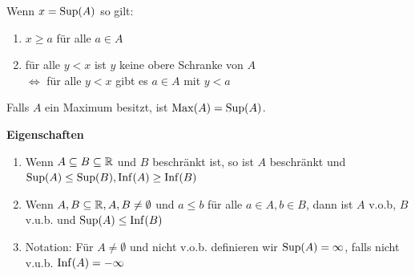 Wenn \textbf{$x = \mathrm{Sup}(A)$} so gilt: 
\begin{enumerate}[label = (\arabic*)]
	\item{\(x\geq a\) für alle \(a\in A\)}
	\item{für alle \(y<x\) ist \(y\) keine obere Schranke von \(A\)\\
			   \(\Leftrightarrow\) für alle \(y<x\) gibt es \(a\in A\) mit \(y<a\)}
\end{enumerate}

Falls $A$ ein Maximum besitzt, ist $\mathrm{Max}(A) = \mathrm{Sup}(A)$. \medskip

\textbf{Eigenschaften}
\begin{enumerate}[label = (\arabic*)]
	\item{Wenn $A \subseteq B \subseteq \mathbb{R}$ und $B$ beschränkt ist, so ist $A$ beschränkt und $\mathrm{Sup}(A) 
	\leq \mathrm{Sup}(B), \mathrm{Inf}(A) \geq \mathrm{Inf}(B)$}
	\item{Wenn $A, B \subseteq \mathbb{R}, A, B \neq \emptyset$ und $a \leq b$ für alle $a \in A, b \in B$, dann 
	ist $A$ v.o.b, $B$ v.u.b. und $\mathrm{Sup}(A) \leq \mathrm{Inf}(B)$}
	\item[]{Notation: Für $A \neq \emptyset$ und nicht v.o.b. definieren wir $\mathrm{Sup}(A) = \infty$, 
	falls nicht v.u.b. $\mathrm{Inf}(A) = -\infty$}
\end{enumerate}
